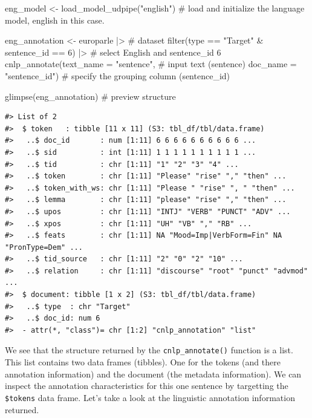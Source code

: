 \documentclass[
  letterpaper,
]{latex/krantz}
\newenvironment{Shaded}{\begin{snugshade}}{\end{snugshade}}
\newcommand{\AttributeTok}[1]{\textcolor[rgb]{0.40,0.45,0.13}{#1}}
\newcommand{\CommentTok}[1]{\textcolor[rgb]{0.37,0.37,0.37}{#1}}
\newcommand{\DecValTok}[1]{\textcolor[rgb]{0.68,0.00,0.00}{#1}}
\newcommand{\FunctionTok}[1]{\textcolor[rgb]{0.28,0.35,0.67}{#1}}
\newcommand{\NormalTok}[1]{\textcolor[rgb]{0.00,0.23,0.31}{#1}}
\newcommand{\OtherTok}[1]{\textcolor[rgb]{0.00,0.23,0.31}{#1}}
\newcommand{\SpecialCharTok}[1]{\textcolor[rgb]{0.37,0.37,0.37}{#1}}
\newcommand{\StringTok}[1]{\textcolor[rgb]{0.13,0.47,0.30}{#1}}
\begin{document}
\begin{Shaded}
\begin{Highlighting}[]
\NormalTok{eng\_model }\OtherTok{\textless{}{-}} \FunctionTok{load\_model\_udpipe}\NormalTok{(}\StringTok{"english"}\NormalTok{) }\CommentTok{\# load and initialize the language model, \textquotesingle{}english\textquotesingle{} in this case.}

\NormalTok{eng\_annotation }\OtherTok{\textless{}{-}} 
\NormalTok{  europarle }\SpecialCharTok{|\textgreater{}} \CommentTok{\# dataset }
  \FunctionTok{filter}\NormalTok{(type }\SpecialCharTok{==} \StringTok{"Target"} \SpecialCharTok{\&}\NormalTok{ sentence\_id }\SpecialCharTok{==} \DecValTok{6}\NormalTok{) }\SpecialCharTok{|\textgreater{}} \CommentTok{\# select English and sentence\_id 6}
  \FunctionTok{cnlp\_annotate}\NormalTok{(}\AttributeTok{text\_name =} \StringTok{"sentence"}\NormalTok{, }\CommentTok{\# input text (sentence)}
                \AttributeTok{doc\_name =} \StringTok{"sentence\_id"}\NormalTok{) }\CommentTok{\# specify the grouping column (sentence\_id)}

\FunctionTok{glimpse}\NormalTok{(eng\_annotation) }\CommentTok{\# preview structure}
\end{Highlighting}
\end{Shaded}

\begin{verbatim}
#> List of 2
#>  $ token   : tibble [11 x 11] (S3: tbl_df/tbl/data.frame)
#>   ..$ doc_id       : num [1:11] 6 6 6 6 6 6 6 6 6 6 ...
#>   ..$ sid          : int [1:11] 1 1 1 1 1 1 1 1 1 1 ...
#>   ..$ tid          : chr [1:11] "1" "2" "3" "4" ...
#>   ..$ token        : chr [1:11] "Please" "rise" "," "then" ...
#>   ..$ token_with_ws: chr [1:11] "Please " "rise" ", " "then" ...
#>   ..$ lemma        : chr [1:11] "please" "rise" "," "then" ...
#>   ..$ upos         : chr [1:11] "INTJ" "VERB" "PUNCT" "ADV" ...
#>   ..$ xpos         : chr [1:11] "UH" "VB" "," "RB" ...
#>   ..$ feats        : chr [1:11] NA "Mood=Imp|VerbForm=Fin" NA "PronType=Dem" ...
#>   ..$ tid_source   : chr [1:11] "2" "0" "2" "10" ...
#>   ..$ relation     : chr [1:11] "discourse" "root" "punct" "advmod" ...
#>  $ document: tibble [1 x 2] (S3: tbl_df/tbl/data.frame)
#>   ..$ type  : chr "Target"
#>   ..$ doc_id: num 6
#>  - attr(*, "class")= chr [1:2] "cnlp_annotation" "list"
\end{verbatim}

We see that the structure returned by the \texttt{cnlp\_annotate()}
function is a list. This list contains two data frames (tibbles). One
for the tokens (and there annotation information) and the document (the
metadata information). We can inspect the annotation characteristics for
this one sentence by targetting the \texttt{\$tokens} data frame. Let's
take a look at the linguistic annotation information returned.
\end{document}
